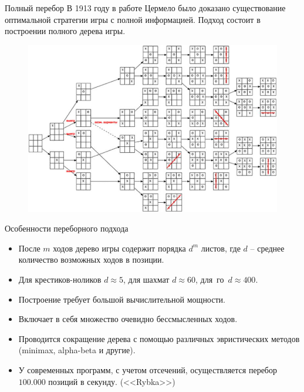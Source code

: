 
\begin{frame}{Полный перебор}
В 1913 году в работе Цермело\footnotemark{} было доказано существование оптимальной стратегии игры с полной информацией.
Подход состоит в построении полного дерева игры.
\begin{figure}
\includegraphics[scale=0.3]{./pictures/xoxo.jpg}
\end{figure}
\end{frame}


\begin{frame}{Особенности переборного подхода}
\begin{itemize}
\item После $m$ ходов дерево игры содержит порядка $d^m$ листов, где $d$ -- среднее количество возможных ходов в позиции.
\item Для крестиков-ноликов $d \approx 5$, для шахмат $d \approx 60$, для~го~$d \approx 400$. 
\item Построение требует большой вычислительной мощности.
\item Включает в себя множество очевидно бессмысленных ходов.
\item Проводится сокращение дерева с помощью различных эвристических методов (minimax, alpha-beta и другие).
\item У современных программ, с учетом отсечений, осуществляется перебор $100.000$ позиций в секунду. (<<Rybka>>)
\end{itemize}
\end{frame}

